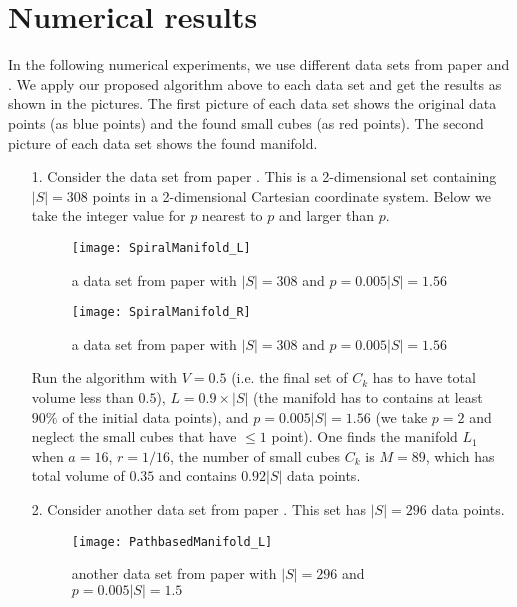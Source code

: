 \documentclass[12pt]{article}
\theoremstyle{plain}
\begin{document}
\section{Numerical results}
In the following numerical experiments, we use different data sets from paper \cite{Chang} and \cite{Jane}. We apply our proposed algorithm above to each data set and get the results as shown in the pictures. The first picture of each data set shows the original data points (as blue points) and the found small cubes (as red points). The second picture of each data set shows the found manifold.
\begin{itemize}
\item[1.] Consider the data set from paper \cite{Chang}. This is a 2-dimensional set containing $|S| = 308$ points in a 2-dimensional Cartesian
coordinate system. Below we take the integer value for $p$ nearest to $p$ and larger than $p$.

\begin{figure}[H]
  \centering
      \texttt{[image: SpiralManifold\_L]}
  \caption{a data set from paper \cite{Chang} with $|S| = 308$ and $p = 0.005|S| = 1.56$}
\end{figure}

\begin{figure}[H]
  \centering
      \texttt{[image: SpiralManifold\_R]}
  \caption{a data set from paper \cite{Chang} with $|S| = 308$ and $p = 0.005|S| = 1.56$}
\end{figure}


\noindent Run the algorithm with $V = 0.5$ (i.e. the final set of $C_k$ has to have total volume less than $0.5$),
 $L = 0.9 \times |S|$ (the manifold has to contains at least $90\%$ of the initial data points), and $p = 0.005|S| = 1.56$ (we take $p=2$ and
 neglect the
 small cubes that have  $\le 1$ point). One finds the manifold $L_1$ when $a = 16$, $r = 1/16$, the number of small cubes
  $C_k$ is $M = 89$, which has total volume of $0.35$ and contains $0.92|S|$ data points.\\

\item[2.] Consider another data set from paper \cite{Chang}. This set has $|S| = 296$ data points.

\begin{figure}[H]
  \centering
      \texttt{[image: PathbasedManifold\_L]}
  \caption{another data set from paper \cite{Chang} with $|S| = 296$ and $p = 0.005|S| = 1.5$}
\end{figure}


\end{itemize}
\end{document}
